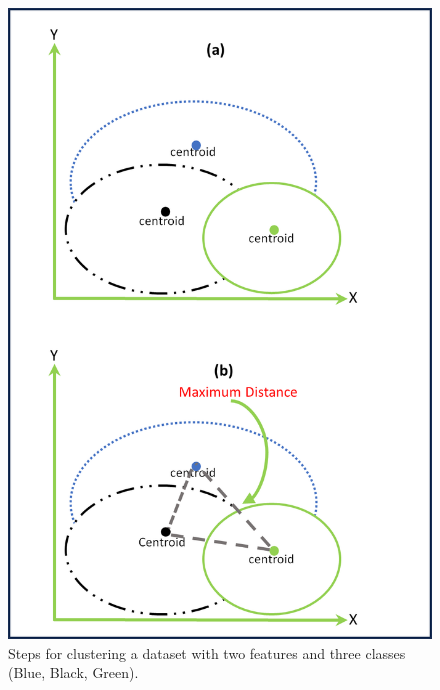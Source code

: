 \begin{figure}[H]
    \centering
    \begin{minipage}{0.48\textwidth}
        \centering
        \includegraphics[width=\linewidth]{5_Emerging/images/scenario1.png}
        \caption{Steps for clustering a dataset with two features and three classes (Blue, Black, Green).}
        \label{fig:scenario1}
    \end{minipage}
    \hfill
    \begin{minipage}{0.48\textwidth}
        \centering

\end{minipage}
\end{figure}
